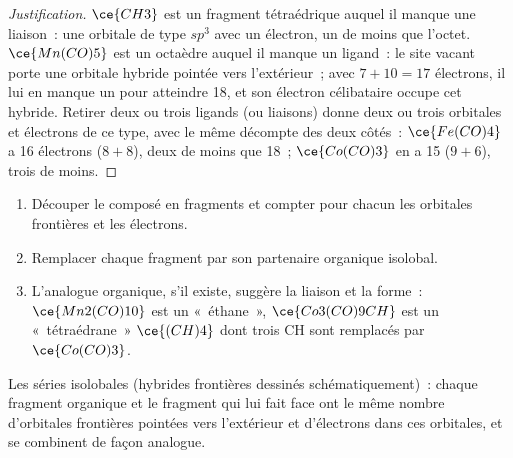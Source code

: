 \begin{proof}[Justification]
$\ce{CH3}$ est un fragment tétraédrique auquel il manque une liaison~: une orbitale de type $sp^3$ avec un
électron, un de moins que l'octet. $\ce{Mn(CO)5}$ est un octaèdre auquel il manque un ligand~: le
site vacant porte une orbitale hybride pointée vers l'extérieur~; avec $7 + 10 = 17$ électrons, il lui en manque
un pour atteindre 18, et son électron célibataire occupe cet hybride.
Retirer deux ou trois ligands (ou liaisons) donne deux ou trois orbitales
et électrons de ce type, avec le même décompte des deux côtés~: $\ce{Fe(CO)4}$ a 16 électrons ($8 + 8$), deux de moins que 18~;
$\ce{Co(CO)3}$ en a 15 ($9 + 6$), trois de moins.
\end{proof}

\begin{method}\label{met:b3:organometallic-bonding:isolobal}
\begin{enumerate}
  \item Découper le composé en fragments et compter pour chacun les
        orbitales frontières et les électrons.
  \item Remplacer chaque fragment par son partenaire organique isolobal.
  \item L'analogue organique, s'il existe, suggère la liaison et la forme~:
        $\ce{Mn2(CO)10}$ est un «~éthane~», $\ce{Co3(CO)9CH}$ est un «~tétraédrane~» $\ce{(CH)4}$ dont trois CH
        sont remplacés par $\ce{Co(CO)3}$.
\end{enumerate}
\end{method}

\begin{omfigure}

{\small Les séries isolobales (hybrides frontières dessinés
schématiquement)~: chaque fragment organique et le fragment  qui lui fait face ont le même nombre d'orbitales frontières
pointées vers l'extérieur et d'électrons dans ces orbitales, et se combinent
de façon analogue.}
\end{omfigure}

